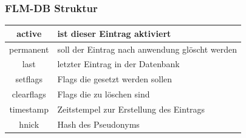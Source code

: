 \begin{frame}
	\frametitle{FLM-DB Struktur}
\begin{tabular}{|c|p{7cm}|}
\hline active     & ist dieser Eintrag aktiviert \\ 
\hline permanent  & soll der Eintrag nach anwendung glöscht werden \\ 
\hline last       & letzter Eintrag in der Datenbank \\ 
\hline setflags   & Flags die gesetzt werden sollen \\ 
\hline clearflags & Flags die zu löschen sind \\
\hline timestamp  & Zeitstempel zur Erstellung des Eintrags \\
\hline hnick      & Hash des Pseudonyms \\
\hline 
\end{tabular} 
\end{frame}
